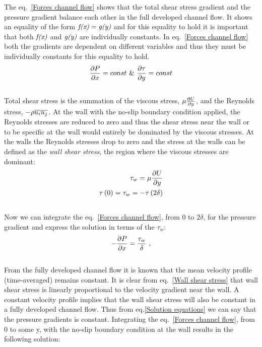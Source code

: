 The eq.~\ref{Forces channel flow} shows that the total shear stress gradient and the pressure gradient balance each other in the full developed channel flow. It shows an equality of the form $\emph{f(x)}= \emph{g(y)}$ and for this equality to hold it is important that both $\emph{f(x)}$ and $\emph{g(y)}$ are individually constants. In eq.~\ref{Forces channel flow} both the gradients are dependent on different variables and thus they must be individually constants for this equality to hold. $$\frac{\partial P}{\partial x} = const\  \&\  \frac{\partial \tau}{\partial y} = const$$\\
%
Total shear stress is the summation of the viscous stress, $ \mu \frac{\partial U}{\partial y} $, and the Reynolds stress, $- \rho\overline{u_iu_j}$. At the wall with the no-slip boundary condition applied, the Reynolds stresses are reduced to zero and thus the shear stress near the wall or to be specific at the wall would entirely be dominated by the viscous stresses. At the walls the Reynolds stresses drop to zero and the stress at the walls can be defined as the \emph{wall shear stress}, the region where the viscous stresses are dominant:
\begin{equation}
\label{Wall shear stress}
\begin{split}
\tau_w = \mu \frac{\partial U}{\partial y}\\
\tau\left(0\right) = \tau_w  = -\tau\left(2\delta\right)\\
\end{split}
\end{equation}\\
%
Now we can integrate the eq.~\ref{Forces channel flow}, from 0 to $2\delta$, for the pressure gradient and express the solution in terms of the $\tau_w$:
%
\begin{equation}
\label{Solution equations}
\begin{split}
-\frac{\partial P}{\partial x} = \frac{\tau_w}{\delta} \ ,\\
\end{split}
\end{equation}\\ 
%
From the fully developed channel flow it is known that the mean velocity profile (time-averaged) remains constant. It is clear from eq.~\ref{Wall shear stress} that wall shear stress is linearly proportional to the velocity gradient near the wall. A constant velocity profile implies that the wall shear stress will also be constant in a fully developed channel flow. Thus from eq.\ref{Solution equations} we can say that the pressure gradients is constant. Integrating the eq.~\ref{Forces channel flow}, from 0 to some y, with the no-slip boundary condition at the wall results in the following solution:
